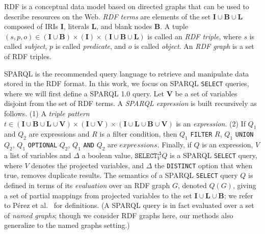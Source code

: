 \documentclass[runningheads]{llncs}
\newcommand{\Iris}{\ensuremath{\mathbf{I}}}
\newcommand{\Lits}{\ensuremath{\mathbf{L}}}
\newcommand{\Bnodes}{\ensuremath{\mathbf{B}}}
\newcommand{\Vars}{\ensuremath{\mathbf{V}}}
\begin{document}
RDF is a conceptual data model based on directed graphs that can be used to describe resources on the Web. \emph{RDF terms} are elements of the set $\Iris \cup \Bnodes \cup \Lits$ composed of IRIs $\Iris$, literals $\Lits$, and blank nodes $\Bnodes$. A tuple $ (s, p, o) \in (\Iris \cup  \Bnodes)  \times (\Iris)  \times  (\Iris \cup \Bnodes \cup  \Lits)$  is called an \emph{RDF triple}, where $s$ is called \emph{subject}, $p$ is called \emph{predicate}, and $o$ is called \emph{object}. An \emph{RDF graph} is a set of RDF triples.

SPARQL is the recommended query language to retrieve and manipulate data stored in the RDF format. In this work, we focus on SPARQL \texttt{SELECT} queries, where we will first define a SPARQL 1.0 query. Let $\Vars$ be a set of variables disjoint from the set of RDF terms. A \emph{SPARQL expression} is built recursively as follows. (1) A \emph{triple pattern} $t \in  (\Iris \cup \Bnodes \cup \Lits \cup \Vars) \times (\Iris \cup \Vars) \times (\Iris \cup \Lits \cup \Bnodes \cup \Vars)$ is an \emph{expression}. (2) If $Q_1$ and $Q_2$ are expressions and $R$ is a filter condition, then $Q_1$ \texttt{FILTER} $R$, $Q_1$ \texttt{UNION} $Q_2$, $Q_1$ \texttt{OPTIONAL} $Q_2$, $Q_1$ \texttt{AND} $Q_2$ are $expressions$. Finally, if $Q$ is an expression, $V$ a list of variables and $\Delta$ a boolean value, $\texttt{SELECT}_V^\Delta Q$ is a SPARQL \texttt{SELECT} query, where $V$ denotes the projected variables, and $\Delta$ the \texttt{DISTINCT} option that when true, removes duplicate results. The semantics of a SPARQL \texttt{SELECT} query $Q$ is defined in terms of its \emph{evaluation} over an RDF graph $G$, denoted $Q(G)$, giving a set of partial mappings from projected variables to the set $\Iris \cup \Lits \cup \Bnodes$; we refer to P{\'{e}}rez et al.~\cite{PerezAG09} for definitions. (A SPARQL query is in fact evaluated over a set of \emph{named graphs}; though we consider RDF graphs here, our methods also generalize to the named graphs setting.)
\end{document}
